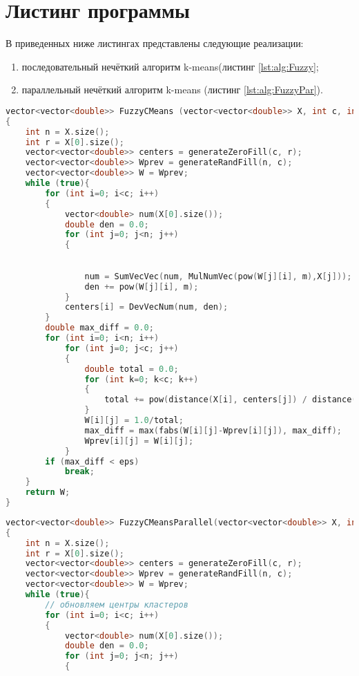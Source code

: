     \section{Листинг программы}
        В приведенных ниже листингах представлены следующие реализации: 
        \begin{enumerate}
            \item последовательный нечёткий алгоритм k-means(листинг \ref{lst:alg:Fuzzy};
            \item параллельный нечёткий алгоритм k-means (листинг \ref{lst:alg:FuzzyPar}).
        \end{enumerate}
        \par \text{           }
        \begin{lstlisting}[language=C++, label=lst:alg:Fuzzy, caption=Последовательный нечёткий алгоритм k-means]
vector<vector<double>> FuzzyCMeans (vector<vector<double>> X, int c, int m, double eps)
{
    int n = X.size();
    int r = X[0].size();
    vector<vector<double>> centers = generateZeroFill(c, r);
    vector<vector<double>> Wprev = generateRandFill(n, c); 
    vector<vector<double>> W = Wprev;
    while (true){
        for (int i=0; i<c; i++)
        {
            vector<double> num(X[0].size());
            double den = 0.0;
            for (int j=0; j<n; j++)
            {
\end{lstlisting}
\par \text{  }
\begin{lstlisting}[language=C++, label=lst:alg:Fuzzy_1, caption=Последовательный нечёткий алгоритм k-means]

                num = SumVecVec(num, MulNumVec(pow(W[j][i], m),X[j]));
                den += pow(W[j][i], m);
            }
            centers[i] = DevVecNum(num, den);
        }
        double max_diff = 0.0;
        for (int i=0; i<n; i++)
            for (int j=0; j<c; j++)
            {
                double total = 0.0;
                for (int k=0; k<c; k++)
                {
                    total += pow(distance(X[i], centers[j]) / distance(X[i], centers[k]), 2/(m-1));
                }
                W[i][j] = 1.0/total;
                max_diff = max(fabs(W[i][j]-Wprev[i][j]), max_diff);
                Wprev[i][j] = W[i][j];
            }
        if (max_diff < eps)
            break;
    }
    return W;
}
        \end{lstlisting}
\begin{lstlisting}[language=C++, label=lst:alg:FuzzyPar, caption=Параллельный нечёткий алгоритм k-means]
vector<vector<double>> FuzzyCMeansParallel(vector<vector<double>> X, int c, int m, double eps, int threads)
{
    int n = X.size();
    int r = X[0].size();
    vector<vector<double>> centers = generateZeroFill(c, r);
    vector<vector<double>> Wprev = generateRandFill(n, c); 
    vector<vector<double>> W = Wprev;
    while (true){
        // обновляем центры кластеров
        for (int i=0; i<c; i++)
        {
            vector<double> num(X[0].size());
            double den = 0.0;
            for (int j=0; j<n; j++)
            {
\end{lstlisting}
